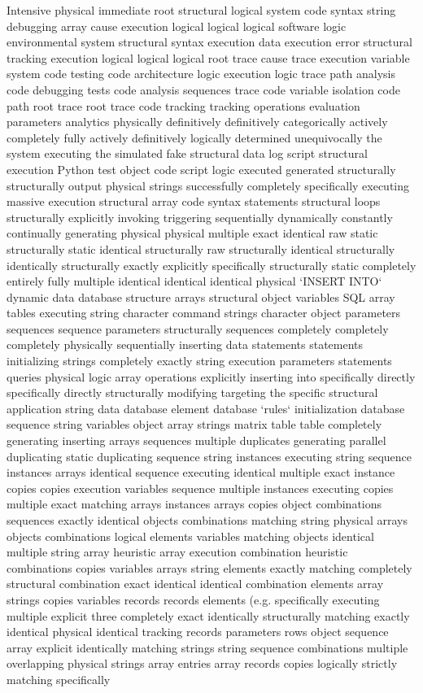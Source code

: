 Intensive physical immediate root structural logical system code syntax string debugging array cause execution logical logical logical software logic environmental system structural syntax execution data execution error structural tracking execution logical logical logical root trace cause trace execution variable system code testing code architecture logic execution logic trace path analysis code debugging tests code analysis sequences trace code variable isolation code path root trace root trace code tracking tracking operations evaluation parameters analytics physically definitively definitively categorically actively completely fully actively definitively logically determined unequivocally the system executing the simulated fake structural data log script structural execution Python test object code script logic executed generated structurally structurally output physical strings successfully completely specifically executing massive execution structural array code syntax statements structural loops structurally explicitly invoking triggering sequentially dynamically constantly continually generating physical physical multiple exact identical raw static structurally static identical structurally raw structurally identical structurally identically structurally exactly explicitly specifically structurally static completely entirely fully multiple identical identical identical physical `INSERT INTO` dynamic data database structure arrays structural object variables SQL array tables executing string character command strings character object parameters sequences sequence parameters structurally sequences completely completely completely physically sequentially inserting data statements statements initializing strings completely exactly string execution parameters statements queries physical logic array operations explicitly inserting into specifically directly specifically directly structurally modifying targeting the specific structural application string data database element database `rules` initialization database sequence string variables object array strings matrix table table completely generating inserting arrays sequences multiple duplicates generating parallel duplicating static duplicating sequence string instances executing string sequence instances arrays identical sequence executing identical multiple exact instance copies copies execution variables sequence multiple instances executing copies multiple exact matching arrays instances arrays copies object combinations sequences exactly identical objects combinations matching string physical arrays objects combinations logical elements variables matching objects identical multiple string array heuristic array execution combination heuristic combinations copies variables arrays string elements exactly matching completely structural combination exact identical identical combination elements array strings copies variables records records elements (e.g. specifically executing multiple explicit three completely exact identically structurally matching exactly identical physical identical tracking records parameters rows object sequence array explicit identically matching strings string sequence combinations multiple overlapping physical strings array entries array records copies logically strictly matching specifically 